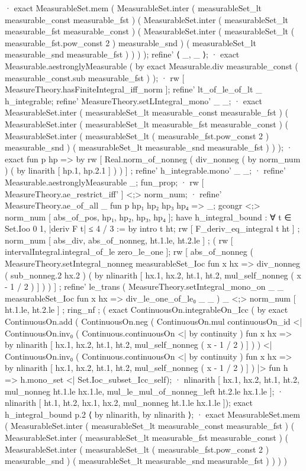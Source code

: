         · exact MeasurableSet.mem ( MeasurableSet.inter ( measurableSet_lt measurable_const measurable_fst ) ( MeasurableSet.inter ( measurableSet_lt measurable_fst measurable_const ) ( MeasurableSet.inter ( measurableSet_lt ( measurable_fst.pow_const 2 ) measurable_snd ) ( measurableSet_lt measurable_snd measurable_fst ) ) ) );
      refine' ⟨ _, _ ⟩;
      · exact Measurable.aestronglyMeasurable ( by exact Measurable.div measurable_const ( measurable_const.sub measurable_fst ) );
      · rw [ MeasureTheory.hasFiniteIntegral_iff_norm ];
        refine' lt_of_le_of_lt _ h_integrable;
        refine' MeasureTheory.setLIntegral_mono' _ _;
        · exact MeasurableSet.inter ( measurableSet_lt measurable_const measurable_fst ) ( MeasurableSet.inter ( measurableSet_lt measurable_fst measurable_const ) ( MeasurableSet.inter ( measurableSet_lt ( measurable_fst.pow_const 2 ) measurable_snd ) ( measurableSet_lt measurable_snd measurable_fst ) ) );
        · exact fun p hp => by rw [ Real.norm_of_nonneg ( div_nonneg ( by norm_num ) ( by linarith [ hp.1, hp.2.1 ] ) ) ] ;
    refine' h_integrable.mono' _ _;
    · refine' Measurable.aestronglyMeasurable _;
      fun_prop;
    · rw [ MeasureTheory.ae_restrict_iff' ] <;> norm_num;
      · refine' MeasureTheory.ae_of_all _ fun p hp₁ hp₂ hp₃ hp₄ => _;
        gcongr <;> norm_num [ abs_of_pos, hp₁, hp₂, hp₃, hp₄ ];
        have h_integral_bound : ∀ t ∈ Set.Ioo 0 1, |deriv F t| ≤ 4 / 3 := by
          intro t ht; rw [ F_deriv_eq_integral t ht ] ; norm_num [ abs_div, abs_of_nonneg, ht.1.le, ht.2.le ] ; (
          rw [ intervalIntegral.integral_of_le zero_le_one ];
          rw [ abs_of_nonneg ( MeasureTheory.setIntegral_nonneg measurableSet_Ioc fun x hx => div_nonneg ( sub_nonneg.2 hx.2 ) ( by nlinarith [ hx.1, hx.2, ht.1, ht.2, mul_self_nonneg ( x - 1 / 2 ) ] ) ) ] ; refine' le_trans ( MeasureTheory.setIntegral_mono_on _ _ measurableSet_Ioc fun x hx => div_le_one_of_le₀ _ _ ) _ <;> norm_num [ ht.1.le, ht.2.le ] ; ring_nf ; (
          exact ContinuousOn.integrableOn_Icc ( by exact ContinuousOn.add ( ContinuousOn.neg ( ContinuousOn.mul continuousOn_id <| ContinuousOn.inv₀ ( Continuous.continuousOn <| by continuity ) fun x hx => by nlinarith [ hx.1, hx.2, ht.1, ht.2, mul_self_nonneg ( x - 1 / 2 ) ] ) ) <| ContinuousOn.inv₀ ( Continuous.continuousOn <| by continuity ) fun x hx => by nlinarith [ hx.1, hx.2, ht.1, ht.2, mul_self_nonneg ( x - 1 / 2 ) ] ) |> fun h => h.mono_set <| Set.Ioc_subset_Icc_self);
          · nlinarith [ hx.1, hx.2, ht.1, ht.2, mul_nonneg ht.1.le hx.1.le, mul_le_mul_of_nonneg_left ht.2.le hx.1.le ];
          · nlinarith [ ht.1, ht.2, hx.1, hx.2, mul_nonneg ht.1.le hx.1.le ]);
        exact h_integral_bound p.2 ⟨ by nlinarith, by nlinarith ⟩;
      · exact MeasurableSet.mem ( MeasurableSet.inter ( measurableSet_lt measurable_const measurable_fst ) ( MeasurableSet.inter ( measurableSet_lt measurable_fst measurable_const ) ( MeasurableSet.inter ( measurableSet_lt ( measurable_fst.pow_const 2 ) measurable_snd ) ( measurableSet_lt measurable_snd measurable_fst ) ) ) )

